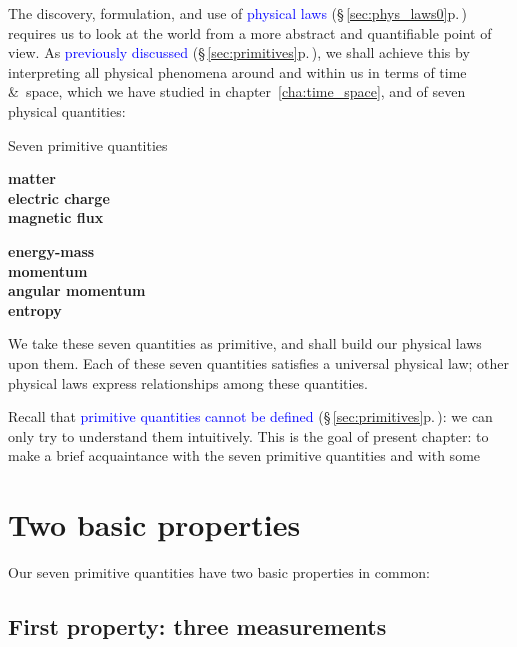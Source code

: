 \documentclass[a4paper,12pt,%
onecolumn,oneside,%
british%
]{memoir}
\newcommand*{\amp}{\&}
\renewcommand*{\|}[1][]{\nonscript\:#1\vert\nonscript\:\mathopen{}}
\newcommand*{\sect}{\S}%
\newcommand*{\chap}{chapter}%
\renewcommand*{\autoref}[3][\sect\,\ref]{\textcolor{blue}{#3} {\color{blue}\scriptsize(\faIcon[regular]{eye}\;#1{#2}\;p.\,\pageref{#2})}}
\newcommand*{\energym}{energy-mass}
\begin{document}
The discovery, formulation, and use of \autoref{sec:phys_laws0}{physical laws} requires us to look at the world from a more abstract and quantifiable point of view.
As \autoref{sec:primitives}{previously discussed}, we shall achieve this by interpreting all physical phenomena around and within us in terms of time \amp\ space, which we have studied in \chap~\ref{cha:time_space}, and of seven physical quantities:
\begin{definition}{Seven primitive quantities}
  \begin{minipage}[c]{0.49\linewidth}
    \begin{center}\bfseries
      matter
      \\ electric charge
      \\ magnetic flux
    \end{center}
  \end{minipage}\hfill
  \begin{minipage}[c]{0.49\linewidth}
    \begin{center}\bfseries
      \energym
      \\ momentum
      \\ angular momentum
      \\[2\jot] entropy
    \end{center}
  \end{minipage}
\end{definition}
We take these seven quantities as primitive, and shall build our physical laws upon them. Each of these seven quantities satisfies a universal physical law; other physical laws express relationships among these quantities.

Recall that \autoref{sec:primitives}{primitive quantities cannot be defined}: we can only try to understand them intuitively. This is the goal of present chapter: to make a brief acquaintance with the seven primitive quantities and with some%

\section{Two basic properties}
\label{sec:sevenquantities_properties}

Our seven primitive quantities have two basic properties in common:

\subsection{First property: three measurements}
\label{sec:sevenquantities_property1}
\end{document}
